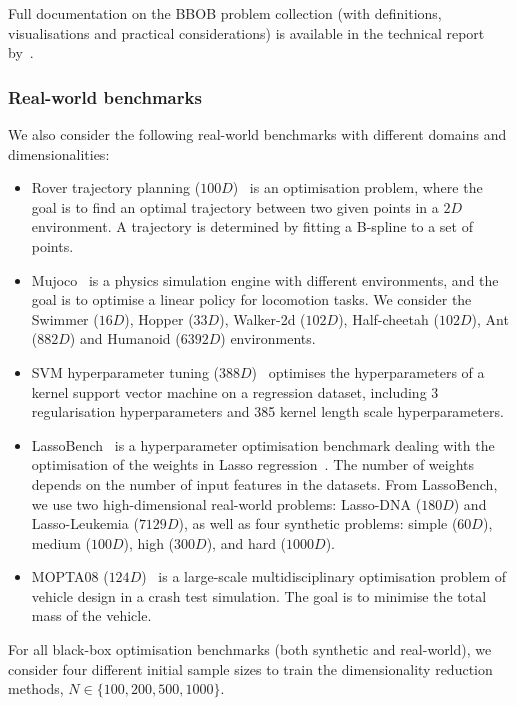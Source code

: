 Full documentation on the BBOB problem collection (with definitions, visualisations and practical considerations) is available in the technical report by~\citet{FinEtAl09}.

\subsubsection*{Real-world benchmarks}

We also consider the following real-world benchmarks with different domains and dimensionalities:
\begin{itemize}
    \item Rover trajectory planning ($100D$)~\citep{WanEtAl18} is an optimisation problem, where the goal is to find an optimal trajectory between two given points in a $2D$ environment. A trajectory is determined by fitting a B-spline to a set of points.
    \item Mujoco~\citep{ManEtAl18,TodEtAl12} is a physics simulation engine with different environments, and the goal is to optimise a linear policy for locomotion tasks. We consider the Swimmer ($16D$), Hopper ($33D$), Walker-2d ($102D$), Half-cheetah ($102D$), Ant ($882D$) and Humanoid ($6392D$) environments.
    \item SVM hyperparameter tuning ($388D$)~\citep{EriJan21} optimises the hyperparameters of a kernel support vector machine on a regression dataset, including 3 regularisation hyperparameters and 385 kernel length scale hyperparameters.
    \item LassoBench~\citep{SehEtAl22} is a hyperparameter optimisation benchmark dealing with the optimisation of the weights in Lasso regression~\cite{GasEtAl09}. The number of weights depends on the number of input features in the datasets. From LassoBench, we use two high-dimensional real-world problems: Lasso-DNA ($180D$) and Lasso-Leukemia ($7129D$), as well as four synthetic problems: simple ($60D$), medium ($100D$), high ($300D$), and hard ($1000D$).
    \item MOPTA08 ($124
    D$)~\citep{Jones08,EriJan21} is a large-scale multidisciplinary optimisation problem of vehicle design in a crash test simulation. The goal is to minimise the total mass of the vehicle.
\end{itemize}

For all black-box optimisation benchmarks (both synthetic and real-world), we consider four different initial sample sizes to train the dimensionality reduction methods, $N \in \{100,200,500,1000 \}$.


